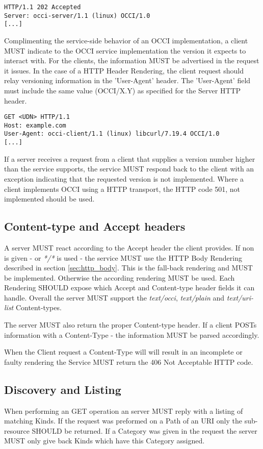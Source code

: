 \documentclass[10pt,a4paper]{article}
\begin{document}
\begin{verbatim}
HTTP/1.1 202 Accepted
Server: occi-server/1.1 (linux) OCCI/1.0
[...]
\end{verbatim}

Complimenting the service-side behavior of an OCCI implementation, a
client MUST indicate to the OCCI service implementation the version it
expects to interact with. For the clients, the information MUST be
advertised in the request it issues. In the case of a HTTP Header
Rendering, the client request should relay versioning information in
the 'User-Agent' header. The 'User-Agent' field must include the same
value (OCCI/X.Y) as specified for the Server HTTP header.

\begin{verbatim}
GET <UDN> HTTP/1.1
Host: example.com
User-Agent: occi-client/1.1 (linux) libcurl/7.19.4 OCCI/1.0
[...]
\end{verbatim}

If a server receives a request from a client that supplies a version
number higher than the service supports, the service MUST respond back
to the client with an exception indicating that the requested version
is not implemented. Where a client implements OCCI using a HTTP
transport, the HTTP code 501, not implemented should be used.

\subsection{Content-type and Accept headers}
A server MUST react according to the Accept header the client
provides. If non is given - or \textit{*/*} is used - the service MUST
use the HTTP Body Rendering described in section
\ref{sec:http_body}. This is the fall-back rendering and MUST be
implemented. Otherwise the according rendering MUST be used. Each
Rendering SHOULD expose which Accept and Content-type header fields it
can handle. Overall the server MUST support the \textit{text/occi},
\textit{text/plain} and \textit{text/uri-list} Content-types.

The server MUST also return the proper Content-type header. If a
client POSTs information with a Content-Type - the information MUST be
parsed accordingly.

When the Client request a Content-Type will will result in an
incomplete or faulty rendering the Service MUST return the 406 Not
Acceptable HTTP code.

\subsection{Discovery and Listing}
When performing an GET operation an server MUST reply with a listing
of matching Kinds. If the request was preformed on a Path of an URI
only the sub-resource SHOULD be returned. If a Category was given in
the request the server MUST only give back Kinds which have this
Category assigned.
\end{document}
